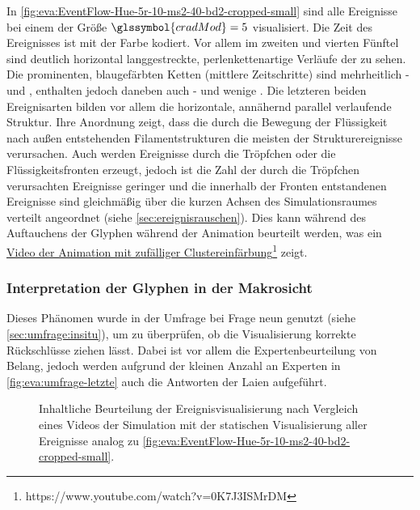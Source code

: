 In \autoref{fig:eva:EventFlow-Hue-5r-10-ms2-40-bd2-cropped-small} sind alle Ereignisse bei einem  der Größe $\glssymbol{cradMod} = 5$ visualisiert. Die Zeit des Ereignisses ist mit der Farbe kodiert. Vor allem im zweiten und vierten Fünftel sind deutlich horizontal langgestreckte, perlenkettenartige Verläufe der  zu sehen. Die prominenten, blaugefärbten Ketten (mittlere Zeitschritte) sind mehrheitlich - und  , enthalten jedoch daneben auch - und wenige . Die letzteren beiden Ereignisarten bilden vor allem die horizontale, annähernd parallel verlaufende Struktur. Ihre Anordnung zeigt, dass die durch die Bewegung der Flüssigkeit nach außen entstehenden Filamentstrukturen die meisten der Strukturereignisse verursachen. Auch werden Ereignisse durch die Tröpfchen oder die Flüssigkeitsfronten erzeugt, jedoch ist die Zahl der durch die Tröpfchen verursachten Ereignisse geringer und die innerhalb der Fronten entstandenen Ereignisse sind gleichmäßig über die kurzen Achsen des Simulationsraumes verteilt angeordnet (siehe \autoref{sec:ereignisrauschen}). Dies kann während des Auftauchens der Glyphen während der Animation beurteilt werden, was ein \href{https://www.youtube.com/watch?v=0K7J3ISMrDM}{Video der Animation mit zufälliger Clustereinfärbung}\footnote{https://www.youtube.com/watch?v=0K7J3ISMrDM} zeigt.

\subsubsection*{Interpretation der Glyphen in der Makrosicht}\label{sec:eva:ereignisse-quali-verlauf:umfrage}
Dieses Phänomen wurde in der Umfrage bei Frage neun genutzt (siehe \autoref{sec:umfrage:insitu}), um zu überprüfen, ob die Visualisierung korrekte Rückschlüsse ziehen lässt. Dabei ist vor allem die Expertenbeurteilung von Belang, jedoch werden aufgrund der kleinen Anzahl an Experten in \autoref{fig:eva:umfrage-letzte} auch die Antworten der Laien aufgeführt.

\begin{figure}
	{\caption{Inhaltliche Beurteilung der Ereignisvisualisierung nach Vergleich eines Videos der Simulation mit der statischen Visualisierung aller Ereignisse analog zu \autoref{fig:eva:EventFlow-Hue-5r-10-ms2-40-bd2-cropped-small}.}\label{fig:eva:umfrage-letzte}}
\end{figure}

